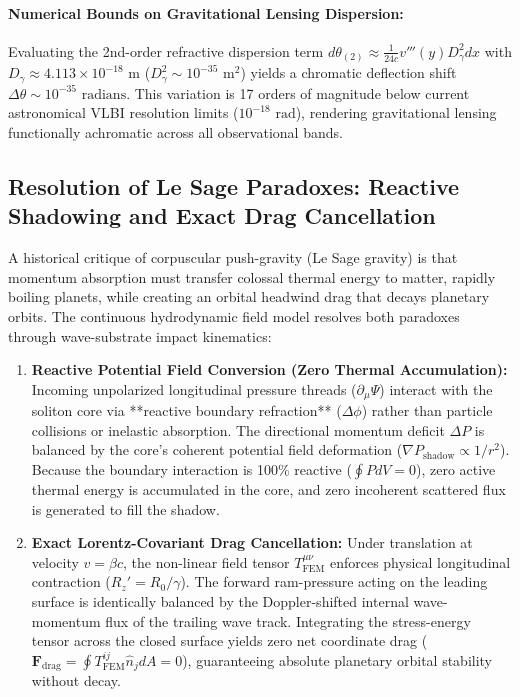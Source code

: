 \documentclass[11pt,a4paper]{article}
\begin{document}
	\paragraph{Numerical Bounds on Gravitational Lensing Dispersion:}
	Evaluating the 2nd-order refractive dispersion term $d\theta_{(2)} \approx \frac{1}{24c} v'''(y) D_\gamma^2 dx$ with $D_\gamma \approx 4.113 \times 10^{-18}\text{ m}$ ($D_\gamma^2 \sim 10^{-35}\text{ m}^2$) yields a chromatic deflection shift $\Delta\theta \sim 10^{-35}\text{ radians}$. This variation is 17 orders of magnitude below current astronomical VLBI resolution limits ($10^{-18}\text{ rad}$), rendering gravitational lensing functionally achromatic across all observational bands.
	
	\subsection{Resolution of Le Sage Paradoxes: Reactive Shadowing and Exact Drag Cancellation}
	A historical critique of corpuscular push-gravity (Le Sage gravity) is that momentum absorption must transfer colossal thermal energy to matter, rapidly boiling planets, while creating an orbital headwind drag that decays planetary orbits. The continuous hydrodynamic field model resolves both paradoxes through wave-substrate impact kinematics:
	\begin{enumerate}
		\item \textbf{Reactive Potential Field Conversion (Zero Thermal Accumulation):} Incoming unpolarized longitudinal pressure threads ($\partial_\mu \Psi$) interact with the soliton core via **reactive boundary refraction** ($\Delta\phi$) rather than particle collisions or inelastic absorption. The directional momentum deficit $\Delta P$ is balanced by the core's coherent potential field deformation ($\nabla P_{\text{shadow}} \propto 1/r^2$). Because the boundary interaction is 100\% reactive ($\oint P dV = 0$), zero active thermal energy is accumulated in the core, and zero incoherent scattered flux is generated to fill the shadow.
		\item \textbf{Exact Lorentz-Covariant Drag Cancellation:} Under translation at velocity $v = \beta c$, the non-linear field tensor $T^{\mu\nu}_{\text{FEM}}$ enforces physical longitudinal contraction ($R_z' = R_0/\gamma$). The forward ram-pressure acting on the leading surface is identically balanced by the Doppler-shifted internal wave-momentum flux of the trailing wave track. Integrating the stress-energy tensor across the closed surface yields zero net coordinate drag ($\mathbf{F}_{\text{drag}} = \oint T^{ij}_{\text{FEM}} \hat{n}_j dA = 0$), guaranteeing absolute planetary orbital stability without decay.
	\end{enumerate}
	
\end{document}
